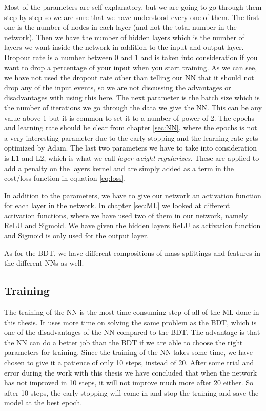Most of the parameters are self explanatory, but we are going to go through them step by step so we are sure that we have understood every one of them. The first one is the number of nodes in each layer (and not the total number in the network). Then we have the number of hidden layers which is the number of layers we want inside the network in addition to the input and output layer. Dropout rate is a number between 0 and 1 and is taken into consideration if you want to drop a percentage of your input when you start training. As we can see, we have not used the dropout rate other than telling our NN that it should not drop any of the input events, so we are not discussing the advantages or disadvantages with using this here. The next parameter is the batch size which is the number of iterations we go through the data we give the NN. This can be any value above 1 but it is common to set it to a number of power of 2. The epochs and learning rate should be clear from chapter \ref{sec:NN}, where the epochs is not a very interesting parameter due to the early stopping and the learning rate gets optimized by Adam. The last two parameters we have to take into consideration is L1 and L2, which is what we call \textit{layer weight regularizes}. These are applied to add a penalty on the layers kernel and are simply added as a term in the cost/loss function in equation \ref{eq:loss}.

In addition to the parameters, we have to give our network an activation function for each layer in the network. In chapter \ref{sec:ML} we looked at different activation functions, where we have used two of them in our network, namely ReLU and Sigmoid. We have given the hidden layers ReLU as activation function and Sigmoid is only used for the output layer. 

As for the BDT, we have different compositions of mass splittings and features in the different NNs as well. 

\subsection{Training}
The training of the NN is the most time consuming step of all of the ML done in this thesis. It uses more time on solving the same problem as the BDT, which is one of the disadvantages of the NN compared to the BDT. The advantage is that the NN can do a better job than the BDT if we are able to choose the right parameters for training. Since the training of the NN takes some time, we have chosen to give it a patience of only 10 steps, instead of 20. After some trial and error during the work with this thesis we have concluded that when the network has not improved in 10 steps, it will not improve much more after 20 either. So after 10 steps, the early-stopping will come in and stop the training and save the model at the best epoch. 

